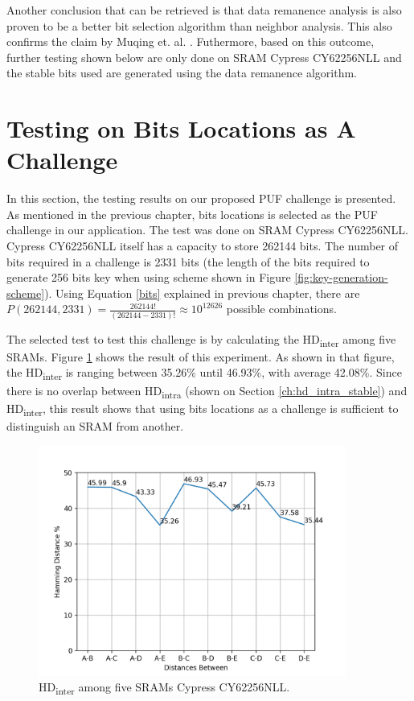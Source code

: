 Another conclusion that can be retrieved is that data remanence analysis is also proven to be a better bit selection algorithm than neighbor analysis. This also confirms the claim by Muqing et. al. \cite{liu_zhou_tang_parhi_kim_2017}. Futhermore, based on this outcome, further testing shown below are only done on SRAM Cypress CY62256NLL and the stable bits used are generated using the data remanence algorithm.

\section{Testing on Bits Locations as A Challenge}
In this section, the testing results on our proposed PUF challenge is presented. As mentioned in the previous chapter, bits locations is selected as the PUF challenge in our application. The test was done on SRAM Cypress CY62256NLL. Cypress CY62256NLL itself has a capacity to store 262144 bits. The number of bits required in a challenge is 2331 bits (the length of the bits required to generate 256 bits key when using scheme shown in Figure \ref{fig:key-generation-scheme}). Using Equation \ref{bits} explained in previous chapter, there are $P(262144, 2331)=\frac{262144!}{\left( 262144-2331 \right) !}\approx 10^{12626}$ possible combinations.

The selected test to test this challenge is by calculating the HD\textsubscript{inter} among five SRAMs. Figure \ref{fig:cy62256cy62256nll_hd_inter_stable_remanences} shows the result of this experiment. As shown in that figure, the HD\textsubscript{inter} is ranging between 35.26\% until 46.93\%, with average 42.08\%. Since there is no overlap between HD\textsubscript{intra} (shown on Section \ref{ch:hd_intra_stable}) and HD\textsubscript{inter}, this result shows that using bits locations as a challenge is sufficient to distinguish an SRAM from another.

\begin{figure}[tph!]
    \centerline{\includegraphics[width={0.9\textwidth}]{images/cy62256nll_hd_inter_stable_remanences}}
    \caption{HD\textsubscript{inter} among five SRAMs Cypress CY62256NLL. }
    \label{fig:cy62256cy62256nll_hd_inter_stable_remanences}
\end{figure}

